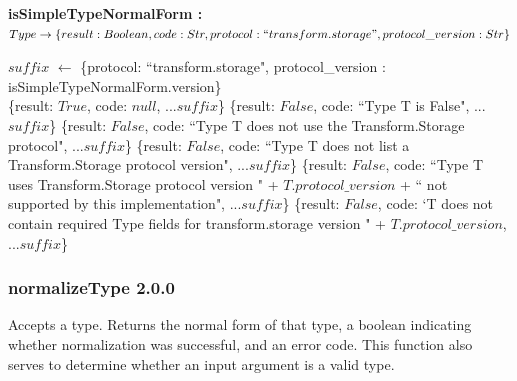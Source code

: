 \documentclass[9pt, oneside]{article}   	%
\begin{document}
\vspace{.25 cm}
\begin{algorithm}[H]
\setcounter{AlgoLine}{0}
\caption{\textbf{isSimpleTypeNormalForm : \\ $Type \rightarrow \{result: Boolean, code: Str, protocol: ``transform.storage", protocol\_version : Str\}$}}
\label{algo_isSimpleTypeNormalForm}
\label{alg:quad}
\SetAlgoLined
$suffix$ $\leftarrow$ \{protocol: ``transform.storage", protocol\_version : isSimpleTypeNormalForm.version\} \\
 {
	\Return \{result: $True$, code: $null$, ...$suffix$\}
	}
{
	\Return \{result: $False$, code: ``Type T is False", ...$suffix$\}
}
{
		{\Return \{result: $False$, code: ``Type T does not use the Transform.Storage protocol", ...$suffix$\}}
		{\Return \{result: $False$, code: ``Type T does not list a Transform.Storage protocol version", ...$suffix$\}}
		{\Return \{result: $False$, code: ``Type T uses Transform.Storage protocol version " + $T.protocol\_version$ + `` not supported by this implementation", ...$suffix$\}}
		{\Return \{result: $False$, code: `T does not contain required Type fields for transform.storage version " + $T.protocol\_version$, ...$suffix$\}}
}
\end{algorithm}


\subsubsection{normalizeType 2.0.0}\label{normalizeType_code}

Accepts a type. Returns the normal form of that type, a boolean indicating whether normalization was successful, and an error code. This function also serves to determine whether an input argument is a valid type.
\end{document}
